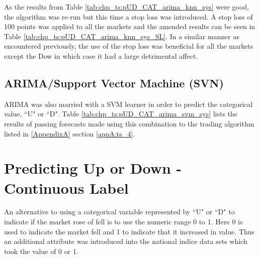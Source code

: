 

As the results from Table \ref{tab:chp_ts:pUD_CAT_arima_knn_sys} were good, the algorithm was re-run but this time a stop loss was introduced. A stop loss of 100 points was applied to all the markets and the amended results can be seen in Table \ref{tab:chp_ts:pUD_CAT_arima_knn_sys_SL}. In a similar manner as encountered previously, the use of the stop loss was beneficial for all the markets except the Dow in which case it had a large detrimental affect.




\subsection{ARIMA/Support Vector Machine (SVN)}

ARIMA was also married with a SVM learner in order to predict the categorical value, \textquotedblleft U" or \textquotedblleft D". Table \ref{tab:chp_ts:pUD_CAT_arima_svm_sys} lists the results of passing forecasts made using this combination to the trading algorithm listed in \ref{AppendixA} section \ref{appA:ts_4}.




\section{Predicting Up or Down - Continuous Label}
An alternative to using a categorical variable represented by \textquotedblleft U" or \textquotedblleft D" to indicate if the market rose of fell is to use the numeric range 0 to 1. Here 0 is used to indicate the market fell and 1 to indicate that it increased in value. Thus an additional attribute was introduced into the national indice data sets which took the value of 0 or 1.

